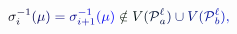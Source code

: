 \documentclass[12pt]{article}
\begin{document}
\makeatletter
\renewcommand*{\@textcolor}[3]{%
  \protect\leavevmode
  \begingroup
    \color#1{#2}#3%
  \endgroup
}
\makeatother
\begin{displaymath}
\mathcolor[RGB]{0,0,15}{\sigma} _ { \mathcolor[RGB]{0,0,30}{i} } ^ { \mathcolor[RGB]{0,0,45}{-} \mathcolor[RGB]{0,0,60}{1} } \mathcolor[RGB]{0,0,75}{(} \mathcolor[RGB]{0,0,90}{\mu} \mathcolor[RGB]{0,0,105}{)} \mathcolor[RGB]{0,0,120}{=} \mathcolor[RGB]{0,0,135}{\sigma} _ { \mathcolor[RGB]{0,0,150}{i} \mathcolor[RGB]{0,0,165}{+} \mathcolor[RGB]{0,0,180}{1} } ^ { \mathcolor[RGB]{0,0,195}{-} \mathcolor[RGB]{0,0,210}{1} } \mathcolor[RGB]{0,0,225}{(} \mathcolor[RGB]{0,0,240}{\mu} \mathcolor[RGB]{0,0,255}{)} \mathcolor[RGB]{0,15,0}{\notin} \mathcolor[RGB]{0,15,15}{V} \mathcolor[RGB]{0,15,30}{(} \mathcal { \mathcolor[RGB]{0,15,45}{P} } _ { \mathcolor[RGB]{0,15,60}{a} } ^ { \mathcolor[RGB]{0,15,75}{\ell} } \mathcolor[RGB]{0,15,90}{)} \mathcolor[RGB]{0,15,105}{\cup} \mathcolor[RGB]{0,15,120}{V} \mathcolor[RGB]{0,15,135}{(} \mathcal { \mathcolor[RGB]{0,15,150}{P} } _ { \mathcolor[RGB]{0,15,165}{b} } ^ { \mathcolor[RGB]{0,15,180}{\ell} } \mathcolor[RGB]{0,15,195}{)} \mathcolor[RGB]{0,15,210}{,}
\end{displaymath}
\end{document}
